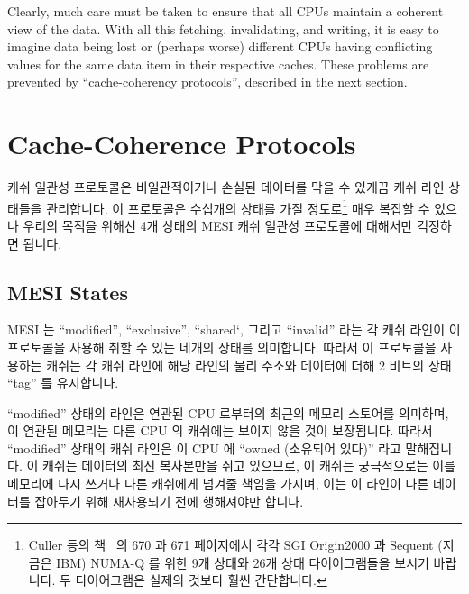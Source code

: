 Clearly, much care must be taken to ensure that all CPUs maintain
a coherent view of the data.
With all this fetching, invalidating, and writing, it is easy to
imagine data being lost or (perhaps worse) different CPUs having
conflicting values for the same data item in their respective
caches.
These problems are prevented by ``cache-coherency protocols'',
described in the next section.

\fi

\section{Cache-Coherence Protocols}
\label{sec:app:whymb:Cache-Coherence Protocols}

캐쉬 일관성 프로토콜은 비일관적이거나 손실된 데이터를 막을 수 있게끔 캐쉬 라인
상태들을 관리합니다.
이 프로토콜은 수십개의 상태를 가질 정도로\footnote{
	Culler 등의 책~\cite{DavidECuller1999} 의 670 과 671 페이지에서 각각
	SGI Origin2000 과 Sequent (지금은 IBM) NUMA-Q 를 위한 9개 상태와 26개
	상태 다이어그램들을 보시기 바랍니다.
	두 다이어그램은 실제의 것보다 훨씬 간단합니다.}
매우 복잡할 수 있으나 우리의 목적을 위해선 4개 상태의 MESI 캐쉬 일관성
프로토콜에 대해서만 걱정하면 됩니다.

\iffalse

Cache-coherency protocols manage cache-line states so as to prevent
inconsistent or lost data.
These protocols can be quite complex, with many tens
of states,\footnote{
	See Culler et al.~\cite{DavidECuller1999} pages 670 and 671
	for the nine-state and 26-state diagrams for SGI Origin2000
	and Sequent (now IBM) NUMA-Q, respectively.
	Both diagrams are significantly simpler than real life.}
but for our purposes we need only concern ourselves with the
four-state MESI cache-coherence protocol.

\fi

\subsection{MESI States}
\label{sec:app:whymb:MESI States}

MESI 는 ``modified'', ``exclusive'', ``shared`, 그리고 ``invalid'' 라는 각 캐쉬
라인이 이 프로토콜을 사용해 취할 수 있는 네개의 상태를 의미합니다.
따라서 이 프로토콜을 사용하는 캐쉬는 각 캐쉬 라인에 해당 라인의 물리 주소와
데이터에 더해 2 비트의 상태 ``tag'' 를 유지합니다.

``modified'' 상태의 라인은 연관된 CPU 로부터의 최근의 메모리 스토어를 의미하며,
이 연관된 메모리는 다른 CPU 의 캐쉬에는 보이지 않을 것이 보장됩니다.
따라서 ``modified'' 상태의 캐쉬 라인은 이 CPU 에 ``owned (소유되어 있다)'' 라고
말해집니다.
이 캐쉬는 데이터의 최신 복사본만을 쥐고 있으므로, 이 캐쉬는 궁극적으로는 이를
메모리에 다시 쓰거나 다른 캐쉬에게 넘겨줄 책임을 가지며, 이는 이 라인이 다른
데이터를 잡아두기 위해 재사용되기 전에 행해져야만 합니다.

